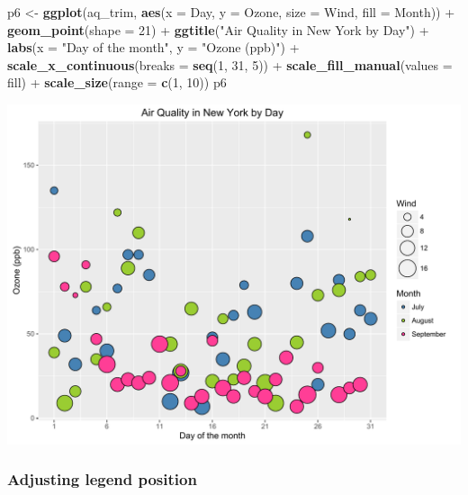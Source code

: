 \documentclass[]{article}
\newenvironment{Shaded}{\begin{snugshade}}{\end{snugshade}}
\newcommand{\KeywordTok}[1]{\textcolor[rgb]{0.13,0.29,0.53}{\textbf{{#1}}}}
\newcommand{\DataTypeTok}[1]{\textcolor[rgb]{0.13,0.29,0.53}{{#1}}}
\newcommand{\DecValTok}[1]{\textcolor[rgb]{0.00,0.00,0.81}{{#1}}}
\newcommand{\StringTok}[1]{\textcolor[rgb]{0.31,0.60,0.02}{{#1}}}
\newcommand{\NormalTok}[1]{{#1}}
\begin{document}
\begin{Shaded}
\begin{Highlighting}[]
\NormalTok{p6 <-}\StringTok{ }\KeywordTok{ggplot}\NormalTok{(aq_trim, }\KeywordTok{aes}\NormalTok{(}\DataTypeTok{x =} \NormalTok{Day, }\DataTypeTok{y =} \NormalTok{Ozone, }\DataTypeTok{size =} \NormalTok{Wind, }\DataTypeTok{fill =} \NormalTok{Month)) +}\StringTok{ }
\StringTok{      }\KeywordTok{geom_point}\NormalTok{(}\DataTypeTok{shape =} \DecValTok{21}\NormalTok{) +}
\StringTok{      }\KeywordTok{ggtitle}\NormalTok{(}\StringTok{"Air Quality in New York by Day"}\NormalTok{) +}\StringTok{ }
\StringTok{      }\KeywordTok{labs}\NormalTok{(}\DataTypeTok{x =} \StringTok{"Day of the month"}\NormalTok{, }\DataTypeTok{y =} \StringTok{"Ozone (ppb)"}\NormalTok{) +}
\StringTok{      }\KeywordTok{scale_x_continuous}\NormalTok{(}\DataTypeTok{breaks =} \KeywordTok{seq}\NormalTok{(}\DecValTok{1}\NormalTok{, }\DecValTok{31}\NormalTok{, }\DecValTok{5}\NormalTok{)) +}
\StringTok{      }\KeywordTok{scale_fill_manual}\NormalTok{(}\DataTypeTok{values =} \NormalTok{fill) +}
\StringTok{      }\KeywordTok{scale_size}\NormalTok{(}\DataTypeTok{range =} \KeywordTok{c}\NormalTok{(}\DecValTok{1}\NormalTok{, }\DecValTok{10}\NormalTok{))}
\NormalTok{p6}
\end{Highlighting}
\end{Shaded}

\begin{center}\includegraphics{0_all_posts_pdf/wscatter_13-1} \end{center}

\subsubsection{Adjusting legend
position}\label{adjusting-legend-position-4}
\end{document}
